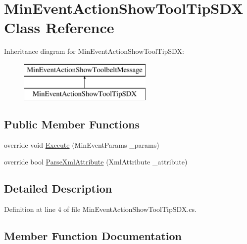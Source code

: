 \hypertarget{class_min_event_action_show_tool_tip_s_d_x}{}\section{Min\+Event\+Action\+Show\+Tool\+Tip\+S\+DX Class Reference}
\label{class_min_event_action_show_tool_tip_s_d_x}
Inheritance diagram for Min\+Event\+Action\+Show\+Tool\+Tip\+S\+DX\+:\begin{figure}[H]
\begin{center}
\leavevmode
\includegraphics[height=2.000000cm]{class_min_event_action_show_tool_tip_s_d_x}
\end{center}
\end{figure}
\subsection*{Public Member Functions}
\begin{DoxyCompactItemize}
\item 
override void \mbox{\hyperlink{class_min_event_action_show_tool_tip_s_d_x_ae614326ceff37a5fde7667d450296163}{Execute}} (Min\+Event\+Params \+\_\+params)
\item 
override bool \mbox{\hyperlink{class_min_event_action_show_tool_tip_s_d_x_a07a5eec000d2750a1f19132c192bbc4b}{Parse\+Xml\+Attribute}} (Xml\+Attribute \+\_\+attribute)
\end{DoxyCompactItemize}


\subsection{Detailed Description}


Definition at line 4 of file Min\+Event\+Action\+Show\+Tool\+Tip\+S\+D\+X.\+cs.



\subsection{Member Function Documentation}
\mbox{\label{class_min_event_action_show_tool_tip_s_d_x_ae614326ceff37a5fde7667d450296163}} 
